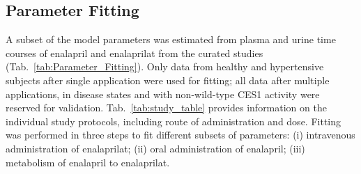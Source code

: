 \documentclass[pharmaceutics,article,submit,pdftex,moreauthors]{Definitions/mdpi}
\begin{document}


\subsection{Parameter Fitting}\label{sec:results_parameter_fitting}
{\color{red}A subset of the model parameters was estimated from plasma and urine time courses of enalapril and enalaprilat from the curated studies~\cite{Arafat2005, Ghosh2012, Ishizaki1988} (Tab.~\ref{tab:Parameter_Fitting}). Only data from healthy and hypertensive subjects after single application were used for fitting; all data after multiple applications, in disease states and with non-wild-type CES1 activity were reserved for validation. Tab.~\ref{tab:study_table} provides information on the individual study protocols, including route of administration and dose.} 
Fitting was performed in three steps to fit different subsets of parameters: (i) intravenous administration of enalaprilat; (ii) oral administration of enalapril; (iii) metabolism of enalapril to enalaprilat.
\end{document}
